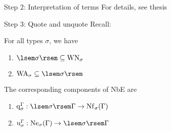 \documentclass{beamer}
\begin{document}
\begin{frame}{Step 2: Interpretation of terms}
For details, see thesis
\end{frame}

\begin{frame}{Step 3: Quote and unquote}
Recall:
\begin{lem}
For all types $\sigma$, we have
\begin{enumerate}
    \item $\sem{\sigma} \subs \mathrm{WN}_\sigma$
    \item $\mathrm{WA}_\sigma \subs \sem{\sigma}$
\end{enumerate}
\end{lem}
The corresponding components of NbE are
\begin{enumerate}
    \item $\quotef{\Gamma}{\sigma} : \sem{\sigma} \Gamma \to \cNf{\Gamma}{\sigma}$
    \item $\unquotef{\Gamma}{\sigma} : \cNe{\Gamma}{\sigma} \to \sem{\sigma} \Gamma$
\end{enumerate}
\end{frame}

\begin{comment}
\begin{frame}
\begin{itemize}
    \item Define $\quotef{\Gamma}{\sigma} : \sem{\sigma}\Gamma \to \cNf{\Gamma}{\sigma}$ and $\unquotef{\Gamma}{\sigma} : \cNe{\Gamma}{\sigma} \to \sem{\sigma}\Gamma$
    \item Define normalization function $\normf{\Gamma}{\sigma} : \cTm{\Gamma}{\sigma} \to \cNf{\Gamma}{\sigma}$
    \begin{align*}
        \normf{\Gamma}{\sigma}(t) &= \quotef{\Gamma}{\sigma}(\ksint{t}{\eta_\Gamma}{\Gamma}), \text{ where}\\
        \idenv{\Gamma}(x, \Gamma') &= \unquotef{\Gamma'}{\sigma}(x)
        \quad \text{for } (x : \sigma) \in \Gamma' \sups \Gamma
    \end{align*}
\end{itemize}
\end{frame}
\end{comment}
\end{document}
